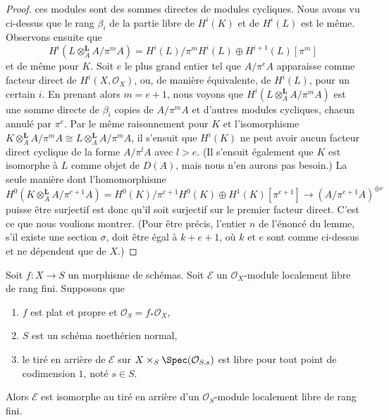 \begin{proof}
ces modules sont des sommes directes de modules cycliques.
Nous avons vu ci-dessus que le rang $\beta_i$ de la
partie libre de $H^i(K)$ et de $H^i(L)$ est le même.
Observons ensuite que
$$
H^i(L \otimes_A^\mathbf{L} A/\pi^m A) =
H^i(L)/\pi^m H^i(L) \oplus H^{i + 1}(L)[\pi^m]
$$
et de même pour $K$. Soit $e$ le plus grand entier
tel que $A/\pi^eA$ apparaisse comme facteur direct de $H^i(X, \mathcal{O}_X)$,
ou, de manière équivalente, de $H^i(L)$, pour un certain $i$. En prenant alors $m = e + 1$,
nous voyons que $H^i(L \otimes_A^\mathbf{L} A/\pi^m A)$ est une somme directe de
$\beta_i$ copies de $A/\pi^m A$ et d'autres modules cycliques,
chacun annulé par $\pi^e$. Par le même raisonnement pour $K$
et l'isomorphisme
$K \otimes_A^\mathbf{L} A/\pi^m A \cong L \otimes_A^\mathbf{L} A/\pi^m A$,
il s'ensuit que $H^i(K)$
ne peut avoir aucun facteur direct cyclique de la forme $A/\pi^l A$
avec $l > e$. (Il s'ensuit également que $K$ est isomorphe à $L$
comme objet de $D(A)$, mais nous n'en aurons pas besoin.)
La seule manière dont l'homomorphisme
$$
H^0(K \otimes^\mathbf{L}_A A/\pi^{e + 1} A) =
H^0(K)/\pi^{e + 1}H^0(K) \oplus H^1(K)[\pi^{e + 1}]
\longrightarrow
(A/\pi^{e + 1} A)^{\oplus r}
$$
puisse être surjectif est donc qu'il soit surjectif sur le
premier facteur direct. C'est ce que nous voulions montrer.
(Pour être précis, l'entier $n$ de l'énoncé du
lemme, s'il existe une section $\sigma$,
doit être égal à $k + e + 1$, où $k$ et $e$ sont comme ci-dessus
et ne dépendent que de $X$.)
\end{proof}

\begin{lemma}
\label{lemma-trivial-over-dvrs}
Soit $f : X \to S$ un morphisme de schémas.
Soit $\mathcal{E}$ un $\mathcal{O}_X$-module localement libre de rang fini.
Supposons que
\begin{enumerate}
\item $f$ est plat et propre et $\mathcal{O}_S = f_*\mathcal{O}_X$,
\item $S$ est un schéma noethérien normal,
\item le tiré en arrière de $\mathcal{E}$ sur $X \times_S \Spec(\mathcal{O}_{S, s})$
est libre pour tout point de codimension $1$, noté $s \in S$.
\end{enumerate}
Alors $\mathcal{E}$ est isomorphe au tiré en arrière d'un
$\mathcal{O}_S$-module localement libre de rang fini.
\end{lemma}

